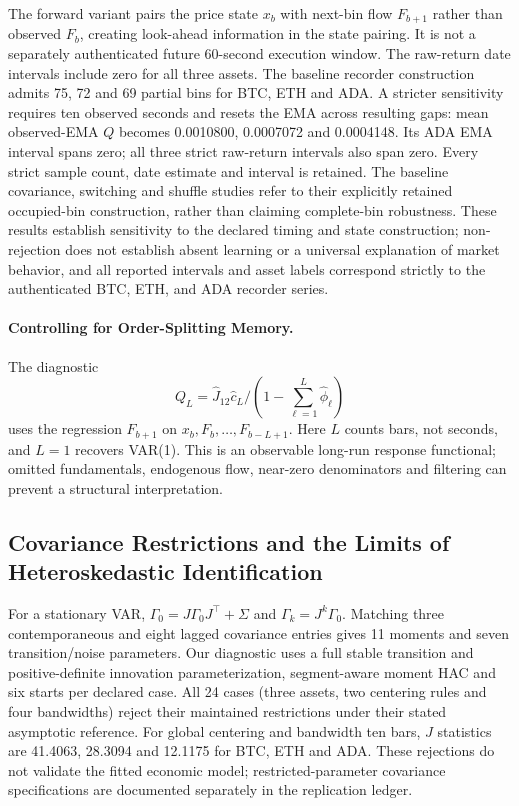 \documentclass[12pt]{article}
\theoremstyle{definition}
\theoremstyle{remark}
\begin{document}
The forward variant pairs the price state $x_b$ with next-bin flow $F_{b+1}$ rather than observed $F_b$, creating look-ahead information in the state pairing. It is not a separately authenticated future 60-second execution window. The raw-return date intervals include zero for all three assets. The baseline recorder construction admits 75, 72 and 69 partial bins for BTC, ETH and ADA. A stricter sensitivity requires ten observed seconds and resets the EMA across resulting gaps: mean observed-EMA $Q$ becomes 0.0010800, 0.0007072 and 0.0004148. Its ADA EMA interval spans zero; all three strict raw-return intervals also span zero. Every strict sample count, date estimate and interval is retained. The baseline covariance, switching and shuffle studies refer to their explicitly retained occupied-bin construction, rather than claiming complete-bin robustness. These results establish sensitivity to the declared timing and state construction; non-rejection does not establish absent learning or a universal explanation of market behavior, and all reported intervals and asset labels correspond strictly to the authenticated BTC, ETH, and ADA recorder series.

\paragraph{Controlling for Order-Splitting Memory.}
The diagnostic \[Q_L=\hat J_{12}\hat c_L/(1-\sum_{\ell=1}^L\hat\phi_\ell)\] uses the regression $F_{b+1}$ on $x_b,F_b,\ldots,F_{b-L+1}$. Here $L$ counts bars, not seconds, and $L=1$ recovers VAR(1). This is an observable long-run response functional; omitted fundamentals, endogenous flow, near-zero denominators and filtering can prevent a structural interpretation.

\subsection{Covariance Restrictions and the Limits of Heteroskedastic Identification}
For a stationary VAR, $\Gamma_0=J\Gamma_0J^\top+\Sigma$ and $\Gamma_k=J^k\Gamma_0$. Matching three contemporaneous and eight lagged covariance entries gives 11 moments and seven transition/noise parameters. Our diagnostic uses a full stable transition and positive-definite innovation parameterization, segment-aware moment HAC and six starts per declared case. All 24 cases (three assets, two centering rules and four bandwidths) reject their maintained restrictions under their stated asymptotic reference. For global centering and bandwidth ten bars, $J$ statistics are 41.4063, 28.3094 and 12.1175 for BTC, ETH and ADA. These rejections do not validate the fitted economic model; restricted-parameter covariance specifications are documented separately in the replication ledger.
\end{document}
